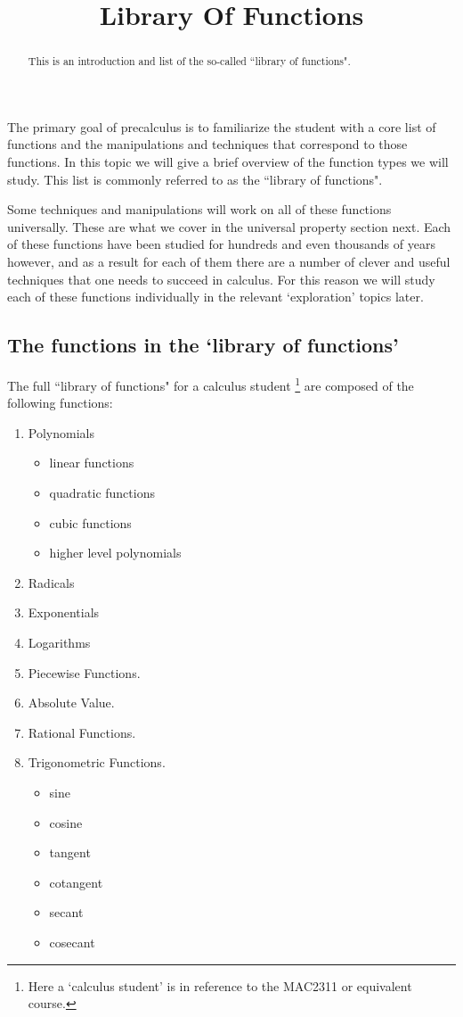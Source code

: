 \documentclass{ximeraXloud}
\title{Library Of Functions}
\begin{document}
\begin{abstract}
This is an introduction and list of the so-called ``library of functions".
\end{abstract}
\maketitle

The primary goal of precalculus is to familiarize the student with a core list of functions and the manipulations and techniques that correspond to those functions. In this topic we will give a brief overview of the function types we will study. This list is commonly referred to as the ``library of functions".

Some techniques and manipulations will work on all of these functions universally. These are what we cover in the universal property section next. Each of these functions have been studied for hundreds and even thousands of years however, and as a result for each of them there are a number of clever and useful techniques that one needs to succeed in calculus. For this reason we will study each of these functions individually in the relevant `exploration' topics later.

\subsection*{The functions in the `library of functions'}
    The full ``library of functions" for a calculus student%
    \footnote{%
        Here a `calculus student' is in reference to the MAC2311 or equivalent course.%
        }
    are composed of the following functions:
    \begin{enumerate}
        \item Polynomials
        \begin{itemize}
            \item linear functions
            \item quadratic functions
            \item cubic functions
            \item higher level polynomials
        \end{itemize}
        \item Radicals
        \item Exponentials
        \item Logarithms
        \item Piecewise Functions.
        \item Absolute Value.
        \item Rational Functions.
        \item Trigonometric Functions.
        \begin{itemize}
            \item sine
            \item cosine
            \item tangent
            \item cotangent
            \item secant
            \item cosecant
        \end{itemize}
    \end{enumerate}
    
\end{document}
